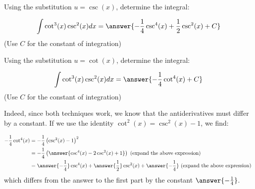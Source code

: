 \documentclass{ximera}
\author{Jason Miller}
\begin{document}
\begin{exercise}
Using the substitution $u= \csc(x)$, determine the integral:

\[
\int \cot^{3}(x) \csc^{2}(x) dx=\answer{- \frac{1}{4}\csc^{4}(x) + \frac{1}{2}\csc^{2}(x) +C }                  
\]         
(Use $C$ for the constant of integration)

Using the substitution $u= \cot(x)$, determine the integral:

\[
\int \cot^{3}(x) \csc^{2}(x) dx=\answer{-\frac{1}{4} \cot^4(x) +C }                  
\]         
(Use $C$ for the constant of integration)

\begin{multipleChoice}
\end{multipleChoice}

\begin{exercise}
Indeed, since both techniques work, we know that the antiderivatives must differ by a constant.  If we use the identity $\cot^2(x) = \csc^2(x)-1$, we find:

\begin{align*}
-\frac{1}{4} \cot^4(x) & = -\frac{1}{4} \left(\csc^2(x)-1\right)^2 \\
&= -\frac{1}{4}\left( \answer{\csc^4(x) - 2 \csc^2(x) +1}\right)  \textrm{ (expand the above expression) } \\
&= \answer{-\frac{1}{4}} \csc^4(x) + \answer{\frac{1}{2}} \csc^2(x) +\answer{-\frac{1}{4}}  \textrm{ (expand the above expression) } \\
\end{align*}
which differs from the answer to the first part by the constant $\answer{-\frac{1}{4}}$.

\end{exercise}
\end{exercise}
\end{document}
